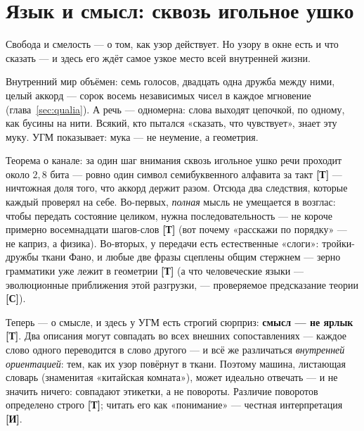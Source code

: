 \documentclass[11pt,letterpaper]{article}
\newcommand{\stT}{\textbf{[Т]}\xspace}
\newcommand{\stC}{\textbf{[С]}\xspace}
\newcommand{\stI}{\textbf{[И]}\xspace}
\begin{document}
\section{Язык и смысл: сквозь игольное ушко}
\label{sec:language}

Свобода и смелость --- о том, как узор действует. Но узору в окне
есть и что сказать --- и здесь его ждёт самое узкое место всей
внутренней жизни.

Внутренний мир объёмен: семь голосов, двадцать одна дружба между
ними, целый аккорд --- сорок восемь независимых чисел в каждое
мгновение (глава~\ref{sec:qualia}). А речь --- одномерна: слова
выходят цепочкой,
по одному, как бусины на нити. Всякий, кто пытался «сказать, что
чувствует», знает эту муку. УГМ показывает: мука --- не неумение, а
геометрия.

Теорема о канале: за один шаг внимания сквозь игольное ушко речи
проходит около $2{,}8$ бита --- ровно один символ семибуквенного
алфавита за такт \stT{} --- ничтожная доля того, что аккорд держит
разом. Отсюда два следствия, которые каждый
проверял на себе. Во-первых, \emph{полная} мысль не умещается в
возглас: чтобы передать состояние целиком, нужна последовательность
--- не короче примерно восемнадцати шагов-слов \stT{}
(вот почему «расскажи по порядку» --- не каприз, а физика).
Во-вторых, у передачи есть естественные «слоги»: тройки-дружбы ткани
Фано, и любые две фразы сцеплены общим стержнем --- зерно грамматики
уже лежит в геометрии \stT{} (а что человеческие языки --- эволюционные
приближения этой разгрузки, --- проверяемое предсказание теории \stC).

Теперь --- о смысле, и здесь у УГМ есть строгий сюрприз:
\textbf{смысл --- не ярлык} \stT. Два описания могут совпадать во
всех внешних сопоставлениях --- каждое слово одного переводится в
слово другого --- и всё же различаться \emph{внутренней ориентацией}:
тем, как их узор повёрнут в ткани. Поэтому машина, листающая словарь
(знаменитая «китайская комната»), может идеально отвечать --- и не
значить ничего: совпадают этикетки, а не повороты. Различие поворотов
определено строго \stT; читать его как «понимание» --- честная
интерпретация \stI.
\end{document}

